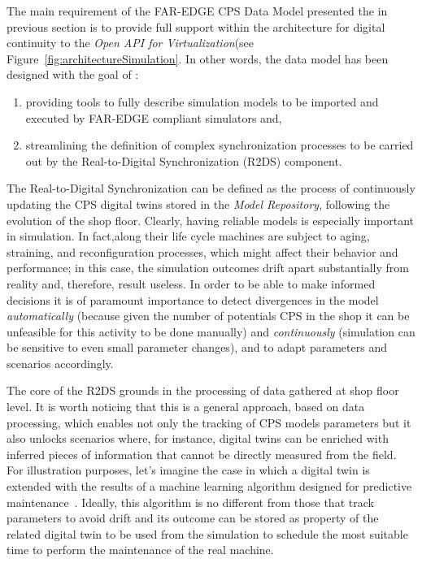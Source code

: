 The main requirement of the FAR-EDGE CPS Data Model presented the in previous section is to provide full support within the architecture for digital continuity to the \textit{Open API for Virtualization}(see Figure~\ref{fig:architectureSimulation}. 
In other words, the data model has been designed with the goal of : 
\begin{enumerate}
\item providing tools to fully describe simulation models to be imported and executed by FAR-EDGE compliant simulators and,
\item streamlining the definition of complex synchronization processes to be carried out by the Real-to-Digital Synchronization (R2DS) component. 
\end{enumerate}

The Real-to-Digital Synchronization can be defined as the process of continuously updating the CPS digital twins stored in the \textit{Model Repository}, following the evolution of the shop floor. 
Clearly, having reliable models is especially important in simulation. 
In fact,along their life cycle machines are subject to aging, straining, and reconfiguration processes, which might affect their behavior and performance; in this case, the simulation outcomes drift apart substantially from reality and, therefore, result useless. 
In order to be able to make informed decisions it is of paramount importance to detect divergences in the model \textit{automatically} (because given the number of  potentials CPS in the shop it can be unfeasible for this activity to be done manually) and \textit{continuously} (simulation can be sensitive to even small parameter changes), and to adapt parameters and scenarios accordingly. 

The core of the R2DS grounds in the processing of data gathered at shop floor level. 
It is worth noticing that this is a general approach, based on data processing, which enables not only the tracking of CPS models parameters but it also unlocks scenarios where, for instance, digital twins can be enriched with inferred pieces of information that cannot be directly measured from the field. 
For illustration purposes, let's imagine the case in which a digital twin is extended with the results of a machine learning algorithm designed for predictive maintenance~\cite{daily2017predictive}. 
Ideally, this algorithm is no different from those that track parameters to avoid drift and its outcome can be stored as property of the related digital twin  to be used from the simulation to schedule the most suitable time to perform the maintenance of the real machine.  

